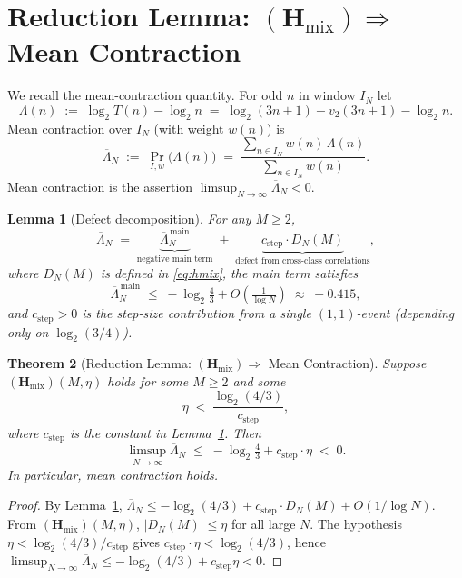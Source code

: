 \documentclass[11pt,a4paper]{article}
\newcommand{\vt}[1]{v_2\!\left(#1\right)}          %
\newcommand{\wn}{w(n)}                              %
\newcommand{\PrIw}{\Pr_{I,w}}                       %
\newcommand{\Hmix}{(\mathbf{H}_{\mathrm{mix}})}     %
\newtheorem{theorem}{Theorem}[section]
\newtheorem{lemma}[theorem]{Lemma}
\begin{document}
\section{Reduction Lemma: $\Hmix \Rightarrow$ Mean Contraction}

We recall the mean-contraction quantity.  For odd $n$ in window $I_N$ let
\[
  \Lambda(n) \;:=\; \log_2 T(n) - \log_2 n
              \;=\; \log_2(3n+1) - \vt{3n+1} - \log_2 n.
\]
Mean contraction over $I_N$ (with weight $\wn$) is
\[
  \overline\Lambda_N \;:=\; \PrIw\!\bigl(\Lambda(n)\bigr)
  \;=\; \frac{\sum_{n \in I_N} w(n)\,\Lambda(n)}{\sum_{n \in I_N} w(n)}.
\]
Mean contraction is the assertion $\limsup_{N\to\infty} \overline\Lambda_N < 0$.

\begin{lemma}[Defect decomposition]\label{lem:defect}
For any $M \ge 2$,
\[
  \overline\Lambda_N
  \;=\;
  \underbrace{\overline\Lambda^{\,\mathrm{main}}_N}_{\text{negative main term}}
  \;+\;
  \underbrace{c_{\mathrm{step}} \cdot D_N(M)}_{\text{defect from cross-class correlations}},
\]
where $D_N(M)$ is defined in \eqref{eq:hmix}, the main term satisfies
\[
  \overline\Lambda^{\,\mathrm{main}}_N
  \;\le\;
  -\log_2\!\tfrac{4}{3} + O\!\left(\tfrac{1}{\log N}\right)
  \;\approx\;
  -0.415,
\]
and $c_{\mathrm{step}} > 0$ is the step-size contribution from a single
$(1,1)$-event (depending only on $\log_2(3/4)$).
\end{lemma}

\begin{theorem}[Reduction Lemma: $\Hmix \Rightarrow$ Mean Contraction]\label{lem:reduction}
Suppose $\Hmix(M,\eta)$ holds for some $M \ge 2$ and some
\[
  \eta \;<\; \frac{\log_2(4/3)}{c_{\mathrm{step}}},
\]
where $c_{\mathrm{step}}$ is the constant in Lemma~\ref{lem:defect}.
Then
\[
  \limsup_{N\to\infty} \overline\Lambda_N
  \;\le\;
  -\log_2\!\tfrac{4}{3} + c_{\mathrm{step}} \cdot \eta
  \;<\; 0.
\]
In particular, mean contraction holds.
\end{theorem}

\begin{proof}[Proof]
By Lemma~\ref{lem:defect}, $\overline\Lambda_N \le -\log_2(4/3) + c_{\mathrm{step}} \cdot D_N(M)
+ O(1/\log N)$.  From $\Hmix(M,\eta)$, $|D_N(M)| \le \eta$ for all large $N$.
The hypothesis $\eta < \log_2(4/3)/c_{\mathrm{step}}$ gives
$c_{\mathrm{step}} \cdot \eta < \log_2(4/3)$, hence
$\limsup_{N\to\infty} \overline\Lambda_N \le -\log_2(4/3) + c_{\mathrm{step}}\eta < 0$.
\end{proof}
\end{document}
